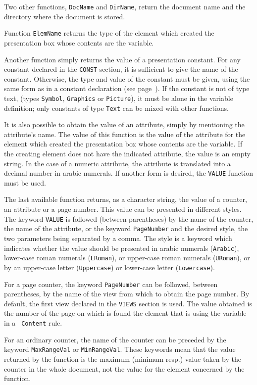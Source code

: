 Two other functions, {\tt DocName} and {\tt DirName}, return the document
name and the directory where the document is stored.

Function {\tt ElemName} returns the type of the element which created
the presentation box whose contents are the variable.

Another function simply returns the value of a presentation constant.
For any constant declared in the {\tt CONST} section, it is sufficient
to give the name of the constant.  Otherwise, the type and value of
the constant must be given, using the same form as in a constant
declaration (see page~\pageref{constpres}). If the constant is not
of type text, (types {\tt Symbol}, {\tt Graphics} or {\tt Picture}),
it must be alone in the variable definition; only constants of type
{\tt Text} can be mixed with other functions.

It is also possible to obtain the value of an attribute, simply by
mentioning the attribute's name.  The value of this function is the
value of the attribute for the element which created the presentation
box whose contents are the variable.  If the creating element does not
have the indicated attribute, the value is an empty string.  In the
case of a numeric attribute, the attribute is translated into a
decimal number in arabic numerals.  If another form is desired, the
{\tt VALUE} function must be used.

The last available function returns, as a character string, the value
of a counter, an attribute or a page number. This value can be
presented in different styles.  The keyword {\tt VALUE} is followed
(between parentheses) by the name of the counter, the name of the
attribute, or the keyword {\tt PageNumber} and the desired style, the
two parameters being separated by a comma.  The style is a keyword
which indicates whether the value should be presented in arabic
numerals ({\tt Arabic}), lower-case roman numerals ({\tt LRoman}),
or upper-case roman numerals ({\tt URoman}), or by an upper-case
letter ({\tt Uppercase}) or lower-case letter ({\tt Lowercase}).

For a page counter, the keyword {\tt PageNumber} can be followed,
between parentheses, by the name of the view from which to obtain the
page number.  By default, the first view declared in the {\tt VIEWS}
section is  used.  The value obtained is the number of the page on
which is found the element that is using the variable in a {\tt
Content} rule.

For an ordinary counter, the name of the counter can be preceded by
the keyword {\tt MaxRangeVal} or {\tt MinRangeVal}.  These keywords
mean that the value returned by the function is the maximum (minimum
resp.) value taken by the counter in the whole document, not the
value for the element concerned by the function.

